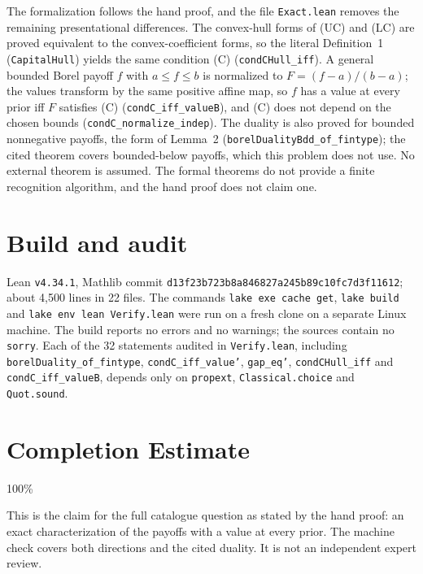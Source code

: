 \documentclass[11pt]{article}
\theoremstyle{definition}
\begin{document}
The formalization follows the hand proof, and the file \texttt{Exact.lean} removes the remaining presentational differences. The convex-hull forms of (UC) and (LC) are proved equivalent to the convex-coefficient forms, so the literal Definition~1 (\texttt{CapitalHull}) yields the same condition (C) (\texttt{condCHull\_iff}). A general bounded Borel payoff $f$ with $a\le f\le b$ is normalized to $F=(f-a)/(b-a)$; the values transform by the same positive affine map, so $f$ has a value at every prior iff $F$ satisfies (C) (\texttt{condC\_iff\_valueB}), and (C) does not depend on the chosen bounds (\texttt{condC\_normalize\_indep}). The duality is also proved for bounded nonnegative payoffs, the form of Lemma~2 (\texttt{borelDualityBdd\_of\_fintype}); the cited theorem covers bounded-below payoffs, which this problem does not use. No external theorem is assumed. The formal theorems do not provide a finite recognition algorithm, and the hand proof does not claim one.

\section{Build and audit}

Lean \texttt{v4.34.1}, Mathlib commit \texttt{d13f23b723b8a846827a245b89c10fc7d3f11612}; about 4,500 lines in 22 files. The commands \texttt{lake exe cache get}, \texttt{lake build} and \texttt{lake env lean Verify.lean} were run on a fresh clone on a separate Linux machine. The build reports no errors and no warnings; the sources contain no \texttt{sorry}. Each of the 32 statements audited in \texttt{Verify.lean}, including \texttt{borelDuality\_of\_fintype}, \texttt{condC\_iff\_value'}, \texttt{gap\_eq'}, \texttt{condCHull\_iff} and \texttt{condC\_iff\_valueB}, depends only on \texttt{propext}, \texttt{Classical.choice} and \texttt{Quot.sound}.

\section*{Completion Estimate}
100\%

This is the claim for the full catalogue question as stated by the hand proof: an exact characterization of the payoffs with a value at every prior. The machine check covers both directions and the cited duality. It is not an independent expert review.
\end{document}
